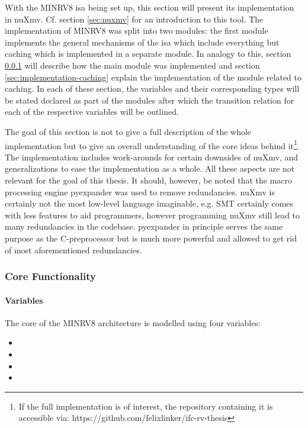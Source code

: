 With the MINRV8 \gls{isa} being set up, this section will present its implementation in nuXmv.
Cf. section \ref{sec:nuxmv} for an introduction to this tool.
The implementation of MINRV8 was split into two modules:
the first module implements the general mechanisms of the \gls{isa} which include everything but caching which is implemented in a separate module.
In analogy to this, section \ref{sec:implementation-core} will describe how the main module was implemented and section \ref{sec:implementation-caching} explain the implementation of the module related to caching.
In each of these section, the variables and their corresponding types will be stated declared as part of the modules after which the transition relation for each of the respective variables will be outlined.

The goal of this section is not to give a full description of the whole implementation but to give an overall understanding of the core ideas behind it\footnote{%
    If the full implementation is of interest, the repository containing it is accessible via: https://github.com/felixlinker/ifc-rv-thesis
}.
The implementation includes work-arounds for certain downsides of nuXmv, and generalizations to ease the implementation as a whole.
All these aspects are not relevant for the goal of this thesis.
It should, however, be noted that the macro processing engine pyexpander \cite{pyexpander} was used to remove redundancies.
nuXmv is certainly not the most low-level language imaginable, e.g. SMT certainly comes with less features to aid programmers, however programming nuXmv still lead to many redundancies in the codebase.
pyexpander in principle serves the same purpose as the C-preprocessor but is much more powerful and allowed to get rid of most aforementioned redundancies.

\subsubsection{Core Functionality}
\label{sec:implementation-core}

\paragraph{Variables}
The core of the MINRV8 architecture is modelled using four variables:
\begin{itemize}
    \item {}
    \item {}
    \item {}
    \item {}
\end{itemize}

